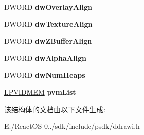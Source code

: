 \begin{DoxyCompactItemize}
D\+W\+O\+RD {\bfseries dw\+Overlay\+Align}
\item 
\mbox{\label{struct___v_i_d_m_e_m_i_n_f_o_a60f7e2293f7880895403cdb56441a7d4}} 
D\+W\+O\+RD {\bfseries dw\+Texture\+Align}
\item 
\mbox{\label{struct___v_i_d_m_e_m_i_n_f_o_ac55a254a9fb53ff07b98670a75a8055e}} 
D\+W\+O\+RD {\bfseries dw\+Z\+Buffer\+Align}
\item 
\mbox{\label{struct___v_i_d_m_e_m_i_n_f_o_ac87f4f9f169babddacff96a53844db97}} 
D\+W\+O\+RD {\bfseries dw\+Alpha\+Align}
\item 
\mbox{\label{struct___v_i_d_m_e_m_i_n_f_o_aff7af42605d752ef0ffb1ab18812d6dc}} 
D\+W\+O\+RD {\bfseries dw\+Num\+Heaps}
\item 
\mbox{\label{struct___v_i_d_m_e_m_i_n_f_o_abed60eab97ddb725b95fe8cc25fefaf2}} 
\hyperlink{struct___v_i_d_m_e_m}{L\+P\+V\+I\+D\+M\+EM} {\bfseries pvm\+List}
\end{DoxyCompactItemize}


该结构体的文档由以下文件生成\+:\begin{DoxyCompactItemize}
\item 
E\+:/\+React\+O\+S-\/0../sdk/include/psdk/ddrawi.\+h\end{DoxyCompactItemize}
